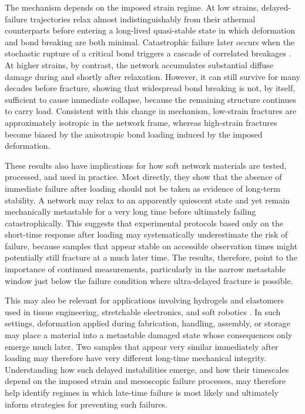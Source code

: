 \documentclass[asymmetricmargins]{library/duthesis}%
\begin{document}
The mechanism depends on the imposed strain regime. At low strains, delayed-failure trajectories relax almost indistinguishably from their athermal counterparts before entering a long-lived quasi-stable state in which deformation and bond breaking are both minimal. Catastrophic failure later occurs when the stochastic rupture of a critical bond triggers a cascade of correlated breakages \cite{mattsson_time-dependent_2017,cipelletti_microscopic_2020,aime_microscopic_2018}. At higher strains, by contrast, the network accumulates substantial diffuse damage during and shortly after relaxation. However, it can still survive for many decades before fracture, showing that widespread bond breaking is not, by itself, sufficient to cause immediate collapse, because the remaining structure continues to carry load. Consistent with this change in mechanism, low-strain fractures are approximately isotropic in the network frame, whereas high-strain fractures become biased by the anisotropic bond loading induced by the imposed deformation.

These results also have implications for how soft network materials are tested, processed, and used in practice. Most directly, they show that the absence of immediate failure after loading should not be taken as evidence of long-term stability. A network may relax to an apparently quiescent state and yet remain mechanically metastable for a very long time before ultimately failing catastrophically. This suggests that experimental protocols based only on the short-time response after loading may systematically underestimate the risk of failure, because samples that appear stable on accessible observation times might potentially still fracture at a much later time. The results, therefore, point to the importance of continued measurements, particularly in the narrow metastable window just below the failure condition where ultra-delayed fracture is possible.

This may also be relevant for applications involving hydrogels and elastomers used in tissue engineering, stretchable electronics, and soft robotics \cite{leeHydrogelsTissueEngineering2001,rogers_materials_2010,martinezSoftActuatorsRobots2014}. In such settings, deformation applied during fabrication, handling, assembly, or storage may place a material into a metastable damaged state whose consequences only emerge much later. Two samples that appear very similar immediately after loading may therefore have very different long-time mechanical integrity. Understanding how such delayed instabilities emerge, and how their timescales depend on the imposed strain and mesoscopic failure processes, may therefore help identify regimes in which late-time failure is most likely and ultimately inform strategies for preventing such failures.
\end{document}
